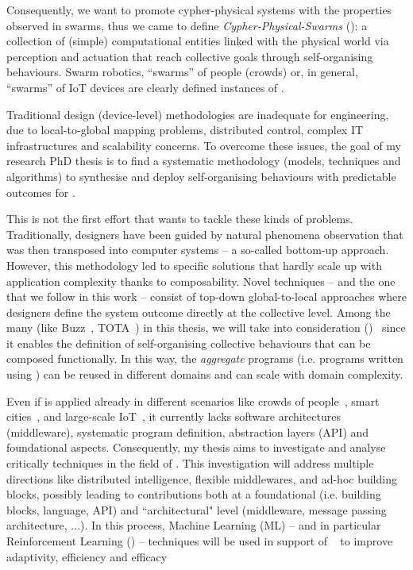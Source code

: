 \documentclass[11pt]{article}
\begin{document}
Consequently, we want to promote cypher-physical systems with the properties observed in swarms, thus we came to define \textit{Cypher-Physical-Swarms} (\cpsw{}): a collection of (simple) computational entities linked with the physical world via perception and actuation that reach collective goals through self-organising behaviours.
%
Swarm robotics, ``swarms” of people (crowds) or, in general, ``swarms” of IoT devices are clearly defined instances of \cpsw{}.

Traditional design (device-level) methodologies are inadequate for \cpsw{} engineering, due to local-to-global mapping problems, distributed control, complex IT infrastructures and scalability concerns.
%
To overcome these issues, the goal of my research PhD thesis is to find a systematic methodology (models, techniques and algorithms) to synthesise and deploy self-organising behaviours with predictable outcomes for \cpsw{}.

This is not the first effort that wants to tackle these kinds of problems. Traditionally, designers have been guided by natural phenomena observation that was then transposed into computer systems -- a so-called
bottom-up approach. However, this methodology led to specific solutions that hardly scale up with application complexity thanks to composability.
%
Novel techniques -- and the one that we follow in this work -- consist of top-down global-to-local approaches where designers define the system outcome directly at the collective level.
%
Among the many (like Buzz~\cite{DBLP:journals/software/PinciroliB16}, TOTA~\cite{DBLP:conf/icdcsw/MameiZL03}) in this thesis, we will take into consideration \textit{\acfull{}} (\ac{})~\cite{DBLP:journals/computer/BealPV15} since it enables the definition of self-organising collective behaviours that can be composed functionally. In this way, the \textit{aggregate} programs (i.e. programs written using \ac{}) can be reused in different domains and can scale with domain complexity. 

Even if \ac{} is applied already in different scenarios like crowds of people~\cite{DBLP:journals/computer/BealPV15}, smart cities~\cite{DBLP:journals/isci/CasadeiFPRSV19}, and large-scale IoT~\cite{DBLP:journals/fgcs/CasadeiFPRSV19}, it currently lacks software architectures (middleware), systematic program definition, abstraction layers (API) and foundational aspects.
%
Consequently, my thesis aims to investigate and analyse critically \acfull{} techniques in the field of \cpsw{}.
%
This investigation will address multiple directions like distributed intelligence, flexible middlewares, and ad-hoc building blocks, possibly leading to contributions both at a foundational (i.e. building blocks, \ac{} language, API) and ``architectural" level (middleware, message passing architecture, ...).
%
In this process, Machine Learning (ML) -- and in particular Reinforcement Learning (\rl{}) -- techniques will be used in support of \acfull{}~\cite{research} to improve adaptivity, efficiency and efficacy
\end{document}
